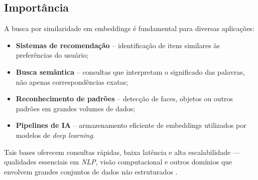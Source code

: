 \subsection{Importância}
A busca por similaridade em embeddings é fundamental para diversas
aplicações:
\begin{itemize}
  \item \textbf{Sistemas de recomendação} – identificação de itens similares às preferências do usuário;
  \item \textbf{Busca semântica} – consultas que interpretam o significado das palavras, não apenas correspondências exatas;
  \item \textbf{Reconhecimento de padrões} – detecção de faces, objetos ou outros padrões em grandes volumes de dados;
  \item \textbf{Pipelines de IA} – armazenamento eficiente de embeddings utilizados por modelos de \emph{deep learning}.
\end{itemize}
Tais bases oferecem consultas rápidas, baixa latência e alta escalabilidade —
qualidades essenciais em \emph{NLP}, visão computacional e outros domínios que
envolvem grandes conjuntos de dados não estruturados
\cite{qwak2024integrating}.

